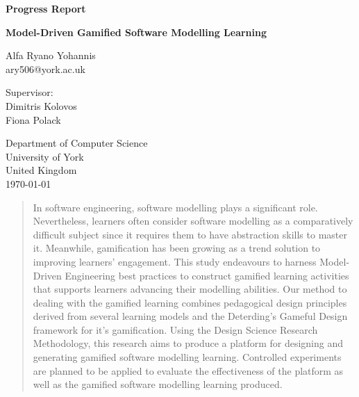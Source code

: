 \documentclass[12pt, a4paper]{report} \usepackage[titletoc]{appendix}
\begin{document}
\begin{titlepage}
 \begin{center}

\textbf{Progress Report}
\vspace{1cm}

\textbf{\large Model-Driven Gamified Software Modelling Learning}
\vspace{1cm}

Alfa Ryano Yohannis\\
ary506@york.ac.uk
\vspace{1cm}

Supervisor:\\
Dimitris Kolovos\\
Fiona Polack\\
\vspace{1cm}

Department of Computer Science\\
University of York\\
United Kingdom\\
\vspace{1cm}
\today
 
\vfill
 
\end{center}
\end{titlepage}


\begin{abstract}
In software engineering, software modelling plays a significant role.
Nevertheless, learners often consider software modelling as a comparatively 
difficult subject since it requires them to have abstraction skills to master it. Meanwhile, gamification has been growing as a trend solution to improving learners' engagement. This study endeavours to harness Model-Driven Engineering best practices to construct gamified learning activities that supports learners advancing their modelling abilities. Our method to dealing with the gamified learning combines pedagogical design principles derived from several learning models and the Deterding's Gameful Design framework for it's gamification. Using the Design Science Research Methodology, this research aims to produce a platform for designing and generating gamified software modelling learning. Controlled experiments are planned to be applied to evaluate the effectiveness of the platform as well as the gamified software modelling learning produced.
\end{abstract}

\tableofcontents
{}
\end{document}

